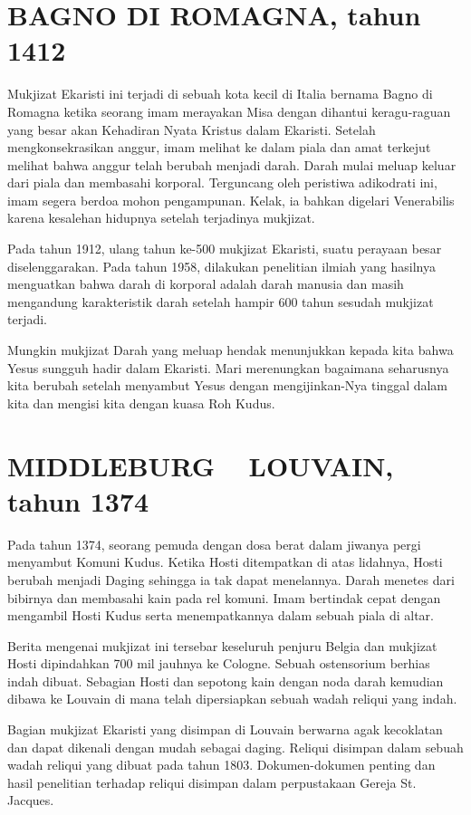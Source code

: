 \section{BAGNO DI ROMAGNA, tahun 1412}
Mukjizat Ekaristi ini terjadi di sebuah kota kecil di Italia bernama Bagno di Romagna ketika seorang imam merayakan Misa dengan dihantui keragu-raguan yang besar akan Kehadiran Nyata Kristus dalam Ekaristi. Setelah mengkonsekrasikan anggur, imam melihat ke dalam piala dan amat terkejut melihat bahwa anggur telah berubah menjadi darah. Darah mulai meluap keluar dari piala dan membasahi korporal. Terguncang oleh peristiwa adikodrati ini, imam segera berdoa mohon pengampunan. Kelak, ia bahkan digelari Venerabilis karena kesalehan hidupnya setelah terjadinya mukjizat.

Pada tahun 1912, ulang tahun ke-500 mukjizat Ekaristi, suatu perayaan besar diselenggarakan. Pada tahun 1958, dilakukan penelitian ilmiah yang hasilnya menguatkan bahwa darah di korporal adalah darah manusia dan masih mengandung karakteristik darah setelah hampir 600 tahun sesudah mukjizat terjadi.

Mungkin mukjizat Darah yang meluap hendak menunjukkan kepada kita bahwa Yesus sungguh hadir dalam Ekaristi. Mari merenungkan bagaimana seharusnya kita berubah setelah menyambut Yesus dengan mengijinkan-Nya tinggal dalam kita dan mengisi kita dengan kuasa Roh Kudus.

\section{MIDDLEBURG ~ LOUVAIN, tahun 1374}
Pada tahun 1374, seorang pemuda dengan dosa berat dalam jiwanya pergi menyambut Komuni Kudus. Ketika Hosti ditempatkan di atas lidahnya, Hosti berubah menjadi Daging sehingga ia tak dapat menelannya. Darah menetes dari bibirnya dan membasahi kain pada rel komuni. Imam bertindak cepat dengan mengambil Hosti Kudus serta menempatkannya dalam sebuah piala di altar.

Berita mengenai mukjizat ini tersebar keseluruh penjuru Belgia dan mukjizat Hosti dipindahkan 700 mil jauhnya ke Cologne. Sebuah ostensorium berhias indah dibuat. Sebagian Hosti dan sepotong kain dengan noda darah kemudian dibawa ke Louvain di mana telah dipersiapkan sebuah wadah reliqui yang indah.

Bagian mukjizat Ekaristi yang disimpan di Louvain berwarna agak kecoklatan dan dapat dikenali dengan mudah sebagai daging. Reliqui disimpan dalam sebuah wadah reliqui yang dibuat pada tahun 1803. Dokumen-dokumen penting dan hasil penelitian terhadap reliqui disimpan dalam perpustakaan Gereja St. Jacques.

